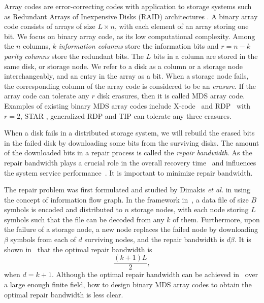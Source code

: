 \documentclass[conference]{IEEEtran}
\begin{document}
Array codes are error-correcting codes with application to storage systems such as Redundant Arrays of Inexpensive Disks (RAID) architectures \cite{patterson1989introduction}. A binary array code consists of  arrays of size $L \times n$, with each element of an array storing one bit. We focus on binary array code, as its low computational complexity. Among the $n$ columns, $k$ \emph{information columns} store the information bits and $r=n-k$ \emph{parity columns} store the redundant bits. The $L$ bits in a column are stored in the same disk, or storage node. We refer to a disk as a column or a storage node interchangeably, and an entry in the array as a bit. When a storage node fails, the corresponding column of the array code is considered to be an \emph{erasure}. If the array code can tolerate any $r$ disk erasures, then it is called MDS array code. Examples of existing binary MDS array codes include X-code~\cite{xu1999x} and RDP~\cite{corbett2004row} with $r=2$, STAR \cite{huang2008star}, generalized RDP \cite{blaum2006family} and TIP \cite{Zhang2015TIP} can tolerate any three erasures.

When a disk fails in a distributed storage system, we will rebuild the erased bits in the failed disk by downloading some bits from the surviving disks. The amount of the downloaded bits in a repair process is called the \emph{repair bandwidth}. As the repair bandwidth plays a crucial role in the overall recovery time~\cite{corbett2004row} and influences the system service performance~\cite{holland1993fast}. It is important to minimize repair bandwidth.

The repair problem was first formulated and studied by Dimakis {\em et al.} in \cite{dimakis2010network}
using the concept of information flow graph. In the framework in~\cite{dimakis2010network}, a data file of size $B$ symbols is encoded and distributed to $n$ storage nodes, with each node storing $L$ symbols such that the file can be decoded from any $k$ of them. Furthermore, upon the failure of a storage node, a new node replaces the failed node by downloading $\beta$ symbols from each of $d$ surviving nodes, and the repair bandwidth is $d\beta$. It is shown in~\cite{dimakis2010network} that the optimal repair bandwidth is
\begin{equation}
\frac{(k+1)L}{2},
\label{optimal_repair}
\end{equation}
when $d=k+1$. Although the optimal repair bandwidth can be achieved in~\cite{tamo2013zigzag,agarwal2015alternate} over a large enough finite field, how to design binary MDS array codes to obtain the optimal repair bandwidth is less clear.
\end{document}
